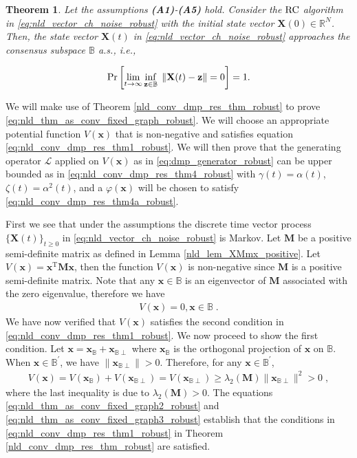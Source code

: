 \documentclass[onecolumn, draft, 12pt]{IEEEtran}
\newcommand{\Cs}{\mathbb{B}}
\newcommand{\Cprime}{\Cs^{'}}
\newcommand{\Ss}{\Cs}
\newcommand{\Rn}{\mathbb{R}^{N}}
\newcommand{\rnld}{\rm RC}
\newcommand{\Lg}{\mathcal{L}}
\newcommand{\Pm}{\mathbf{M}}
\newcommand{\Xcp}{\mathbf{x}_{\Cs \perp}}
\newcommand{\XPX}{{\mathbf{x}}^{\mathrm{T}} \mathbf{M} \mathbf{x}}
\newcommand{\X}{\mathbf{X}}
\newcommand{\xX}{\mathbf{x}}
\newcommand{\Z}{\mathbf{z}}
\newcommand{\vX}{ V(\mathbf{x})}
\newcommand{\fitX}{ \varphi(\mathbf{x})}
\newtheorem{thm}{Theorem}
\begin{document}
\begin{thm} \label{nld_thm_as_conv_fixed_graph_robust} Let the assumptions \textbf{(A1)}-\textbf{(A5)} hold. Consider the $\rnld$ algorithm in \eqref{eq:nld_vector_ch_noise_robust} with the initial state vector $\X(0) \in \Rn$. Then, the state vector $\X(t)$ in \eqref{eq:nld_vector_ch_noise_robust} approaches the consensus subspace $\Cs$ a.s., i.e.,

\begin{equation} \label{eq:nld_thm_as_conv_fixed_graph_robust}
{\rm Pr}\left[ \lim_{t \rightarrow \infty} \inf_{\Z \in \Cs} \; \| \X(t) - \Z \| =0 \right]=1.
\end{equation}
\end{thm}

\begin{IEEEproof}
We will make use of Theorem \ref{nld_conv_dmp_res_thm_robust} to prove \eqref{eq:nld_thm_as_conv_fixed_graph_robust}. We will choose an appropriate potential function $\vX$ that is non-negative and satisfies equation \eqref{eq:nld_conv_dmp_res_thm1_robust}. We will then prove that the generating operator $\Lg$ applied on $\vX$ as in \eqref{eq:dmp_generator_robust} can be upper bounded as in \eqref{eq:nld_conv_dmp_res_thm4_robust} with $\gamma(t)=\alpha(t)$, $\zeta(t)= \alpha^2(t)$, and a $\fitX$ will be chosen to satisfy \eqref{eq:nld_conv_dmp_res_thm4a_robust}. 

First we see that under the assumptions the discrete time vector process $\{\X(t)\}_{t \geq 0}$ in \eqref{eq:nld_vector_ch_noise_robust} is Markov. Let $\Pm$ be a positive semi-definite matrix as defined in Lemma \ref{nld_lem_XMmx_positive}. Let $\vX=\XPX$, then the function $\vX$ is non-negative since $\Pm$ is a positive semi-definite matrix. Note that any $\xX \in \Cs$ is an eigenvector of $\Pm$ associated with the zero eigenvalue, therefore we have
\begin{align}
\label{eq:nld_thm_as_conv_fixed_graph2_robust}
\vX  = 0, \xX \in \Cs \;.
\end{align}  
We have now verified that $\vX$ satisfies the second condition in \eqref{eq:nld_conv_dmp_res_thm1_robust}. We now proceed to show the first condition. Let $\xX = \xX_{\Ss} + \xX_{\Ss \perp}$ where $\xX_{\Ss}$ is the orthogonal projection of $\xX$ on $\Ss$. When $\xX \in \Cprime$, we have $\| \Xcp \| > 0$. Therefore, for any $\xX \in \Cprime$,
\begin{align}
\label{eq:nld_thm_as_conv_fixed_graph3_robust}
\vX   = V(\xX_{\Ss}) + V(\xX_{\Ss \perp}) = V(\xX_{\Ss \perp}) \geq \lambda_2 (\Pm) \| \Xcp \|^2 >0 \;,
\end{align}
where the last inequality is due to $\lambda_2 (\Pm) > 0$. The equations \eqref{eq:nld_thm_as_conv_fixed_graph2_robust} and \eqref{eq:nld_thm_as_conv_fixed_graph3_robust} establish that the conditions in \eqref{eq:nld_conv_dmp_res_thm1_robust} in Theorem \ref{nld_conv_dmp_res_thm_robust} are satisfied.


\end{IEEEproof}
\end{document}
